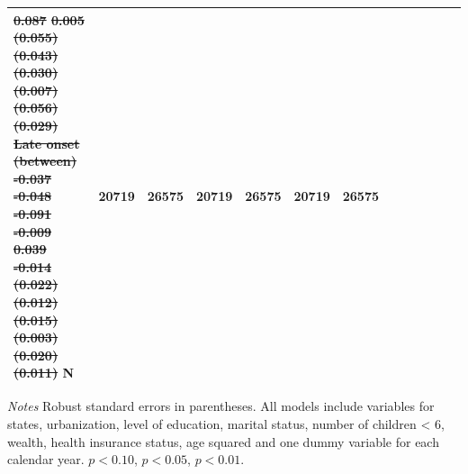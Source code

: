 \documentclass[12pt,english]{article}
\providecommand{\DIFdeltex}[1]{{\protect\color{red}\sout{#1}}}                      %
\providecommand{\DIFdelFL}[1]{\DIFdel{#1}} %
\providecommand{\DIFdelendFL}{} %
\providecommand{\DIFdel}[1]{\texorpdfstring{\DIFdeltex{#1}}{}} %
\begin{document}
\begin{table}[p]
\begin{center}
\begin{adjustbox}{max width=\linewidth}
\begin{threeparttable}
{\begin{tabular}{l*{6}{S S}}
\DIFdelFL{0.087         }%
\DIFdelFL{0.005         }%
\DIFdelFL{(0.055)         }%
\DIFdelFL{(0.043)         }%
\DIFdelFL{(0.030)         }%
\DIFdelFL{(0.007)         }%
\DIFdelFL{(0.056)         }%
\DIFdelFL{(0.029)         }%
\DIFdelFL{Late onset (between)}%
\DIFdelFL{-0.037}%
\DIFdelFL{-0.048}%
\DIFdelFL{-0.091}%
\DIFdelFL{-0.009}%
\DIFdelFL{0.039}%
\DIFdelFL{-0.014         }%
\DIFdelFL{(0.022)         }%
\DIFdelFL{(0.012)         }%
\DIFdelFL{(0.015)         }%
\DIFdelFL{(0.003)         }%
\DIFdelFL{(0.020)         }%
\DIFdelFL{(0.011)         }%
\DIFdelendFL \midrule
						N         &    20719         &    26575         &    20719         &    26575         &    20719         &    26575         \\
						\bottomrule
					\end{tabular}
					\begin{tablenotes}
						\item \footnotesize \textit{Notes} Robust standard errors in parentheses. All models include variables for  states, urbanization, level of education, marital status, number of children < 6, wealth, health insurance status, age squared and one dummy variable for each calendar year. \sym{*} \(p<0.10\), \sym{**} \(p<0.05\), \sym{***} \(p<0.01\).
					\end{tablenotes}
				}
			\end{threeparttable}
		\end{adjustbox}
	\end{center}
\end{table} 

\clearpage
\end{document}
